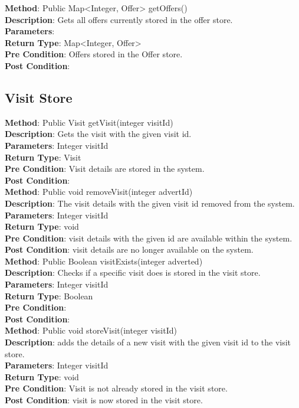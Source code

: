 \documentclass{l3deliverable}
\begin{document}
\textbf{Method}: Public Map<Integer, Offer> getOffers()\\
\textbf{Description}: Gets all offers currently stored in the offer store. \\
\textbf{Parameters}: \\
\textbf{Return Type}: Map<Integer, Offer>\\
\textbf{Pre Condition}: Offers stored in the Offer store.\\
\textbf{Post Condition}: \\

\subsection{Visit Store}

\textbf{Method}: Public Visit getVisit(integer visitId)\\
\textbf{Description}: Gets the visit with the given visit id. \\
\textbf{Parameters}: Integer visitId\\
\textbf{Return Type}: Visit\\
\textbf{Pre Condition}: Visit details are stored in the system.\\
\textbf{Post Condition}:\\

\textbf{Method}: Public void removeVisit(integer advertId)\\
\textbf{Description}: The visit details with the given visit id removed from the system. \\
\textbf{Parameters}: Integer visitId\\
\textbf{Return Type}: void\\
\textbf{Pre Condition}: visit details with the given id are available within the system.\\
\textbf{Post Condition}: visit details are no longer available on the system.\\

\textbf{Method}: Public Boolean visitExists(integer adverted)\\
\textbf{Description}: Checks if a specific visit does is stored in the visit store. \\
\textbf{Parameters}: Integer visitId\\
\textbf{Return Type}: Boolean\\
\textbf{Pre Condition}:\\
\textbf{Post Condition}:\\

\textbf{Method}: Public void storeVisit(integer visitId) \\
\textbf{Description}:  adds the details of a new visit with the given visit id to the visit store.\\
\textbf{Parameters}: Integer visitId\\
\textbf{Return Type}: void\\
\textbf{Pre Condition}: Visit is not already stored in the visit store.\\
\textbf{Post Condition}: visit is now stored in the visit store.\\
\end{document}
